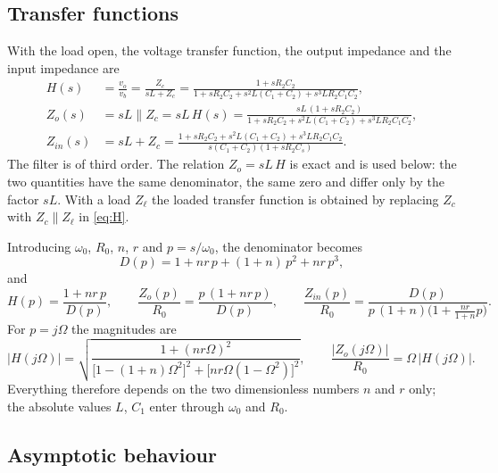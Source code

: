 \documentclass[11pt,a4paper]{article}
\begin{document}
\subsection{Transfer functions}

With the load open, the voltage transfer function, the output impedance and the input
impedance are
\begin{align}
H(s) &= \frac{v_o}{v_b} = \frac{Z_c}{sL + Z_c}
      = \frac{1 + s R_2 C_2}{1 + s R_2 C_2 + s^2 L (C_1 + C_2) + s^3 L R_2 C_1 C_2},
\label{eq:H}\\[1mm]
Z_o(s) &= sL \parallel Z_c = sL\,H(s)
      = \frac{sL\,(1 + s R_2 C_2)}{1 + s R_2 C_2 + s^2 L (C_1 + C_2) + s^3 L R_2 C_1 C_2},
\label{eq:Zo}\\[1mm]
Z_{in}(s) &= sL + Z_c
      = \frac{1 + s R_2 C_2 + s^2 L (C_1 + C_2) + s^3 L R_2 C_1 C_2}{s (C_1 + C_2)(1 + s R_2 C_s)}.
\label{eq:Zin}
\end{align}
The filter is of third order. The relation $Z_o = sL\,H$ is exact and is used below: the
two quantities have the same denominator, the same zero and differ only by the factor
$sL$. With a load $Z_\ell$ the loaded transfer function is obtained by replacing $Z_c$
with $Z_c \parallel Z_\ell$ in \eqref{eq:H}.

Introducing $\omega_0$, $R_0$, $n$, $r$ and $p = s/\omega_0$, the denominator becomes
\begin{equation}
D(p) = 1 + n r\,p + (1+n)\,p^2 + n r\,p^3,
\label{eq:D}
\end{equation}
and
\begin{equation}
H(p) = \frac{1 + n r\, p}{D(p)}, \qquad
\frac{Z_o(p)}{R_0} = \frac{p\,(1 + n r\, p)}{D(p)}, \qquad
\frac{Z_{in}(p)}{R_0} = \frac{D(p)}{p\,(1+n)\bigl(1 + \tfrac{n r}{1+n} p\bigr)}.
\label{eq:Hnorm}
\end{equation}
For $p = j\Omega$ the magnitudes are
\begin{equation}
|H(j\Omega)| = \sqrt{\frac{1 + (n r \Omega)^2}{\bigl[1 - (1+n)\Omega^2\bigr]^2 + \bigl[n r \Omega (1 - \Omega^2)\bigr]^2}},
\qquad
\frac{|Z_o(j\Omega)|}{R_0} = \Omega\,|H(j\Omega)|.
\label{eq:Hmag}
\end{equation}
Everything therefore depends on the two dimensionless numbers $n$ and $r$ only; the
absolute values $L$, $C_1$ enter through $\omega_0$ and $R_0$.

\subsection{Asymptotic behaviour}
\end{document}
